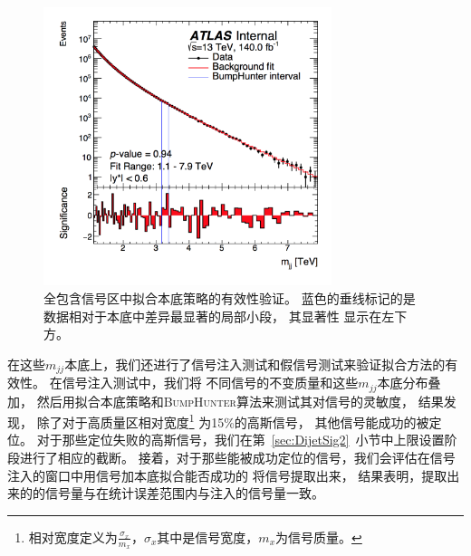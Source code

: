 \begin{figure}[!ht]
        \centering
                \includegraphics[width=0.75\textwidth]{figuresDijet/Appendix-BH/plain.png}
        \caption{全包含信号区中拟合本底策略的有效性验证。
        蓝色的垂线标记的是数据相对于本底中差异最显著的局部小段，
	其显著性
	显示在左下方。
        }
        \label{fig:BH_stdPlot}
\end{figure}


在这些$m_{jj}$本底上，我们还进行了信号注入测试和假信号测试来验证拟合方法的有效性。
在信号注入测试中，我们将
不同信号的不变质量和这些$m_{jj}$本底分布叠加，
然后用拟合本底策略和\textsc{BumpHunter}算法来测试其对信号的灵敏度，
结果发现，
除了对于高质量区相对宽度\footnote{相对宽度定义为$\frac{\sigma_x}{m_x}$，$\sigma_x$其中是信号宽度，$m_x$为信号质量。}
为15\%的高斯信号，
其他信号能成功的被定位。
对于那些定位失败的高斯信号，我们在第~\ref{sec:DijetSig2}~小节中上限设置阶段进行了相应的截断。
接着，对于那些能被成功定位的信号，我们会评估在信号注入的窗口中用信号加本底拟合能否成功的
将信号提取出来，
结果表明，提取出来的的信号量与在统计误差范围内与注入的信号量一致。

